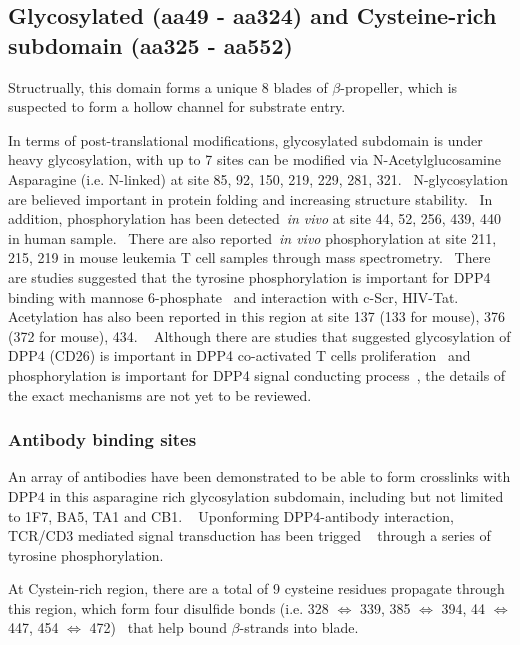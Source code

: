 \subsection{Glycosylated (aa49 - aa324) and Cysteine-rich subdomain (aa325 - aa552)}

Structrually, this domain forms a unique 8 blades of $\beta$-propeller, which is suspected to form a hollow channel for substrate entry.

In terms of post-translational modifications, glycosylated subdomain is under heavy glycosylation, with up to 7 sites can be modified via N-Acetylglucosamine Asparagine (i.e. N-linked) at site 85, 92, 150, 219, 229, 281, 321.~\cite{Rasmussen2003,Thoma2003,Meng2010,Chen2009,Hiramatsu2003} N-glycosylation are believed important in protein folding and increasing structure stability.~\cite{Fan_1997} In addition, phosphorylation has been detected~\textit{in vivo} at site 44, 52, 256, 439, 440 in human sample.~\cite{Xia2008, Hornbeck2015, Mertins2014} There are also reported~\textit{in vivo} phosphorylation at site 211, 215, 219 in mouse leukemia T cell samples through mass spectrometry.~\cite{Hornbeck2015} There are studies suggested that the tyrosine phosphorylation is important for DPP4 binding with mannose 6-phosphate~\cite{Ikushima_2000} and interaction with c-Scr, HIV-Tat.~\cite{Bilodeau_2006,Fan_2012}
Acetylation has also been reported in this region at site 137 (133 for mouse), 376 (372 for mouse), 434. ~\cite{Lundby2012,Weinert2013} Although there are studies that suggested glycosylation of DPP4 (CD26) is important in DPP4 co-activated T cells proliferation~\cite{Ikushima_2000} and phosphorylation is important for DPP4 signal conducting process~\cite{Ishii_2001}, the details of the exact mechanisms are not yet to be reviewed.
\par

\subsubsection{Antibody binding sites}
An array of antibodies have been demonstrated to be able to form crosslinks with DPP4 in this asparagine rich glycosylation subdomain, including but not limited to 1F7, BA5, TA1 and CB1. ~\cite{Hegen1997,Gaetaniello1998,De_Meester_1999} Uponforming DPP4-antibody interaction, TCR/CD3 mediated signal transduction has been trigged ~\cite{Hegen1997} through a series of tyrosine phosphorylation.
\par

At Cystein-rich region, there are a total of 9 cysteine residues propagate through this region, which form four disulfide bonds (i.e. 328 $\Leftrightarrow$ 339, 385 $\Leftrightarrow$ 394, 44 $\Leftrightarrow$ 447, 454 $\Leftrightarrow$ 472)~\cite{Hiramatsu2003} that help bound $\beta$-strands into blade. 

